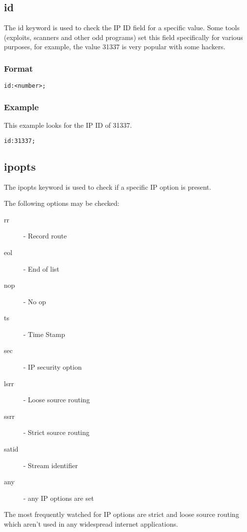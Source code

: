\documentclass[english]{report}
\begin{document}
\subsection{id}

The id keyword is used to check the IP ID field for a specific value.  Some
tools (exploits, scanners and other odd programs) set this field specifically
for various purposes, for example, the value 31337 is very popular with some
hackers. 

\subsubsection{Format}

\begin{verbatim}
id:<number>;
\end{verbatim}

\subsubsection{Example}

This example looks for the IP ID of 31337.
\begin{verbatim}
id:31337;
\end{verbatim}

\subsection{ipopts}

The ipopts keyword is used to check if a specific IP option is present.

The following options may be checked:
\begin{description}
\item [rr] - Record route 
\item [eol] - End of list 
\item [nop] - No op 
\item [ts] - Time Stamp 
\item [sec] - IP security option 
\item [lsrr] - Loose source routing 
\item [ssrr] - Strict source routing 
\item [satid] - Stream identifier
\item [any] - any IP options are set
\end{description}

The most frequently watched for IP options are strict and loose source
routing which aren't used in any widespread internet applications.
\end{document}
